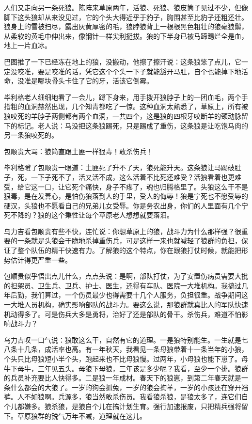 \par 人们又走向另一条死狼。陈阵来草原两年，活狼、死狼、狼皮筒子见过不少，但像脚下这头狼却从来没见过，它的个头大得近乎于豹子，胸围甚至比豹子还粗还壮。狼身上的雪被扫尽，露出灰黄厚密的毛，狼脖狼背上一根根黑色粗壮的狼毫狼鬃，从柔软的黄毛中伸出来，像钢针一样尖利挺拔。狼的下半身已被马蹄踢烂全是血，地上一片血冰。
\par 巴图推了一下已经冻在地上的狼，没搬动，他擦了擦汗说：这条狼笨了点儿，它一定没咬准，要是咬准的话，凭它这个个头一下子就能豁开马肚，自个也能掉下地活命，没准是哪块骨头卡住了它的牙，活该它倒霉。
\par 毕利格老人细细地看了一会儿，蹲下身来，用手拨开狼脖子上的一团血毛，两个手指粗的血洞赫然出现，几个知青都吃了一惊。这种血洞太熟悉了，草原上，所有被狼咬死的羊脖子两侧都有两个血洞，一共四个，这是狼的四根牙咬断羊的颈动脉留下的标记。老人说：马没把这条狼踢死，只是踢成了重伤，这条狼是让吃饱马肉的另一条狼咬死的。
\par 包顺贵大骂：狼简直跟土匪一样狠毒！敢杀伤兵！
\par 毕利格瞪了包顺贵一眼道：土匪死了升不了天，狼死能升天。这条狼让马踢破肚子，死，一下子死不了，活又活不成，这么活着不比死还难受？活狼看着也更难受，给它这一口，让它死个痛快，身子不疼了，魂也归腾格里了。头狼这么干不是狠毒，是在发善心，是怕伤狼落到人的手里，受人的侮辱！狼是宁死也不愿受辱的硬汉，头狼也不愿看自己的兄弟儿女受辱。你是务农出身，你们的人里面有几个宁死不降的？狼的这个秉性让每个草原老人想想就要落泪。
\par 乌力吉看包顺贵有些不快，连忙说：你想草原上的狼，战斗力为什么那样强？很重要的一条就是头狼会干脆地杀掉重伤兵，可是这样一来也就减轻了狼群的负担，保证了整个队伍的精干快速有力。了解狼的这个特点，你在跟狼打仗时候，就能把形势估计得更严重一些。
\par 包顺贵似乎悟出点儿什么，点点头说：是啊，部队打仗，为了安置伤病员需要大批的担架员、卫生兵、卫兵、护士、医生，还得有车队、医院一大堆机构。我搞过几年后勤，我们算过，一个伤员最少也得需要十几个人服务，负担很重。战争期间这一大堆人员机构，确实影响部队的战斗力。要这么说，那狼群就真比人的军队快速机动得多了。可是伤兵大多是勇将，治好了还是部队的骨干。杀伤兵，难道不怕影响战斗力？
\par 乌力吉叹一口气说：狼敢这么干，自然有它的道理。一是狼特别能生。一生就是七八条十几条，成活率也高。有一年秋天，我看见一条母狼带着十一条当年的小狼，个头只比母狼短小半个头，跑起来也不比母狼慢。过两年，小母狼也能下崽了。母牛下母牛，三年见五头。母狼下母狼，三年该是多少呢？我看，至少一个排。狼群的兵员补充要比人快得多。二是狼一年成材。春天下的狼崽，到第二年春天就是一条什么都会的大狼了。一岁的狗会抓兔，一岁的狼会掏羊，一岁的小孩还在穿开裆裤。人不如狼啊。兵源多，狼当然敢杀伤员。我看狼杀狼，是狼太多了，连它们自个儿都嫌多。狼杀狼，是狼自个儿在搞计划生育。强行加速报废，只把精兵强将留下。草原狼群的锐气万年不减，道理就在这儿。
